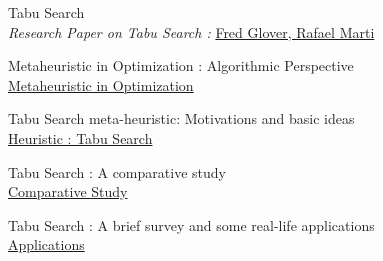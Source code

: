 \documentclass[conference]{IEEEtran}
\begin{document}
\begin{thebibliography}{9}
Tabu Search\\
\textit{Research Paper on Tabu Search : }
\href{https://www.uv.es/~rmarti/paper/docs/ts2.pdf}{Fred Glover, Rafael Marti}

Metaheuristic in Optimization : Algorithmic Perspective\\
\href{https://www.uv.es/~rmarti/paper/docs/ts2.pdf}{Metaheuristic in Optimization}

Tabu Search meta-heuristic: Motivations and basic ideas\\
\href{https://web2.qatar.cmu.edu/~gdicaro/15382/additional/tabu-search.pdf}{Heuristic : Tabu Search}

Tabu Search : A comparative study\\
\href{https://www.researchgate.net/publication/221787181_Tabu_Search_A_Comparative_Study}{Comparative Study}

Tabu Search : A brief survey and some real-life applications\\
\href{http://elib.mi.sanu.ac.rs/files/journals/yjor/11/yujorn11p5-17.pdf}{Applications}





\end{thebibliography}
\end{document}
